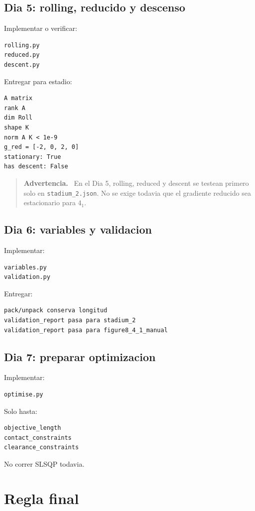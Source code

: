 \documentclass[11pt,letterpaper]{amsart}
\newenvironment{warningbox}
{\par\medskip\noindent\begin{quote}\textbf{Advertencia.}\ }
{\end{quote}\par\medskip}
\begin{document}
\subsection*{Dia 5: rolling, reducido y descenso}

Implementar o verificar:
\begin{verbatim}
rolling.py
reduced.py
descent.py
\end{verbatim}

Entregar para estadio:
\begin{verbatim}
A matrix
rank A
dim Roll
shape K
norm A K < 1e-9
g_red = [-2, 0, 2, 0]
stationary: True
has descent: False
\end{verbatim}

\begin{warningbox}
En el Dia 5, rolling, reduced y descent se testean primero solo en
\texttt{stadium\_2.json}. No se exige todavia que el gradiente reducido sea
estacionario para \(4_1\).
\end{warningbox}

\subsection*{Dia 6: variables y validacion}

Implementar:
\begin{verbatim}
variables.py
validation.py
\end{verbatim}

Entregar:
\begin{verbatim}
pack/unpack conserva longitud
validation_report pasa para stadium_2
validation_report pasa para figure8_4_1_manual
\end{verbatim}

\subsection*{Dia 7: preparar optimizacion}

Implementar:
\begin{verbatim}
optimise.py
\end{verbatim}

Solo hasta:
\begin{verbatim}
objective_length
contact_constraints
clearance_constraints
\end{verbatim}

No correr SLSQP todavia.

\section{Regla final}
\end{document}
